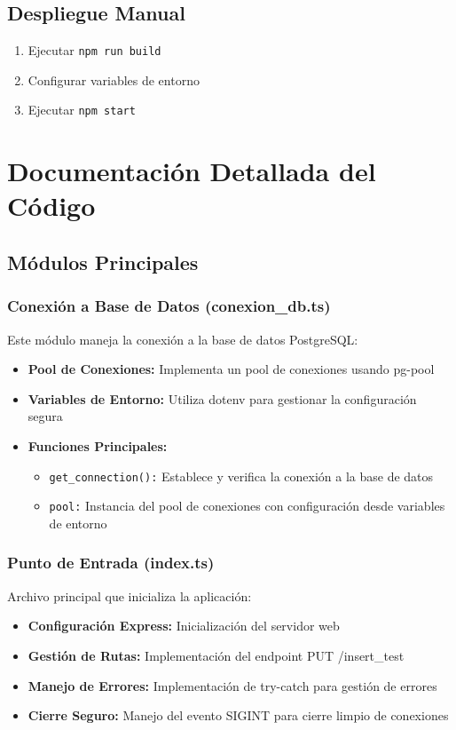 \documentclass{article}
\begin{document}
\subsection{Despliegue Manual}
\begin{enumerate}
    \item Ejecutar \texttt{npm run build}
    \item Configurar variables de entorno
    \item Ejecutar \texttt{npm start}
\end{enumerate}

\section{Documentación Detallada del Código}

\subsection{Módulos Principales}

\subsubsection{Conexión a Base de Datos (conexion\_db.ts)}
Este módulo maneja la conexión a la base de datos PostgreSQL:
\begin{itemize}
    \item \textbf{Pool de Conexiones:} Implementa un pool de conexiones usando pg-pool
    \item \textbf{Variables de Entorno:} Utiliza dotenv para gestionar la configuración segura
    \item \textbf{Funciones Principales:}
    \begin{itemize}
        \item \texttt{get\_connection():} Establece y verifica la conexión a la base de datos
        \item \texttt{pool:} Instancia del pool de conexiones con configuración desde variables de entorno
    \end{itemize}
\end{itemize}

\subsubsection{Punto de Entrada (index.ts)}
Archivo principal que inicializa la aplicación:
\begin{itemize}
    \item \textbf{Configuración Express:} Inicialización del servidor web
    \item \textbf{Gestión de Rutas:} Implementación del endpoint PUT /insert\_test
    \item \textbf{Manejo de Errores:} Implementación de try-catch para gestión de errores
    \item \textbf{Cierre Seguro:} Manejo del evento SIGINT para cierre limpio de conexiones
\end{itemize}
\end{document}
